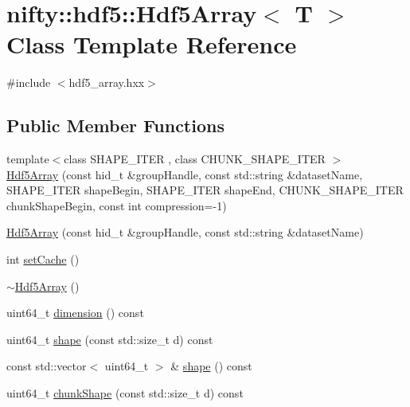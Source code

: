 \hypertarget{classnifty_1_1hdf5_1_1Hdf5Array}{}\section{nifty\+:\+:hdf5\+:\+:Hdf5\+Array$<$ T $>$ Class Template Reference}
\label{classnifty_1_1hdf5_1_1Hdf5Array}


{\ttfamily \#include $<$hdf5\+\_\+array.\+hxx$>$}

\subsection*{Public Member Functions}
\begin{DoxyCompactItemize}
\item 
{\footnotesize template$<$class S\+H\+A\+P\+E\+\_\+\+I\+T\+ER , class C\+H\+U\+N\+K\+\_\+\+S\+H\+A\+P\+E\+\_\+\+I\+T\+ER $>$ }\\\hyperlink{classnifty_1_1hdf5_1_1Hdf5Array_af164b10a52ab55e3f5a72004b6f6e278}{Hdf5\+Array} (const hid\+\_\+t \&group\+Handle, const std\+::string \&dataset\+Name, S\+H\+A\+P\+E\+\_\+\+I\+T\+ER shape\+Begin, S\+H\+A\+P\+E\+\_\+\+I\+T\+ER shape\+End, C\+H\+U\+N\+K\+\_\+\+S\+H\+A\+P\+E\+\_\+\+I\+T\+ER chunk\+Shape\+Begin, const int compression=-\/1)
\item 
\hyperlink{classnifty_1_1hdf5_1_1Hdf5Array_a8ce039a0d357f3c20a30fa5f6d595cb5}{Hdf5\+Array} (const hid\+\_\+t \&group\+Handle, const std\+::string \&dataset\+Name)
\item 
int \hyperlink{classnifty_1_1hdf5_1_1Hdf5Array_a59e94ddc29dd4ba7e85a11c68960ea77}{set\+Cache} ()
\item 
\hyperlink{classnifty_1_1hdf5_1_1Hdf5Array_a6f02962174e64b4c893b287f735cd30d}{$\sim$\+Hdf5\+Array} ()
\item 
uint64\+\_\+t \hyperlink{classnifty_1_1hdf5_1_1Hdf5Array_a4c5acf1a05db2bccd714c64a1389a287}{dimension} () const
\item 
uint64\+\_\+t \hyperlink{classnifty_1_1hdf5_1_1Hdf5Array_abdd78be3ed04346a5bffab6f86cadfc5}{shape} (const std\+::size\+\_\+t d) const
\item 
const std\+::vector$<$ uint64\+\_\+t $>$ \& \hyperlink{classnifty_1_1hdf5_1_1Hdf5Array_a960760163a8422c8138410c7513ef5cb}{shape} () const
\item 
uint64\+\_\+t \hyperlink{classnifty_1_1hdf5_1_1Hdf5Array_a560b26f3d26ee99ecc1bdf0fa6a14a8d}{chunk\+Shape} (const std\+::size\+\_\+t d) const
\item 

\end{DoxyCompactItemize}
